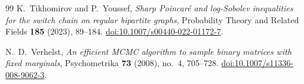 \begin{thebibliography}{99}
K.~Tikhomirov and P.~Youssef,
\emph{Sharp Poincar\'e and log-Sobolev inequalities for the switch chain on
regular bipartite graphs},
Probability Theory and Related Fields \textbf{185} (2023), 89--184.
\href{https://doi.org/10.1007/s00440-022-01172-7}{doi:10.1007/s00440-022-01172-7}.

N.~D.~Verhelst,
\emph{An efficient MCMC algorithm to sample binary matrices with fixed marginals},
Psychometrika \textbf{73} (2008), no.~4, 705--728.
\href{https://doi.org/10.1007/s11336-008-9062-3}{doi:10.1007/s11336-008-9062-3}.

\end{thebibliography}
